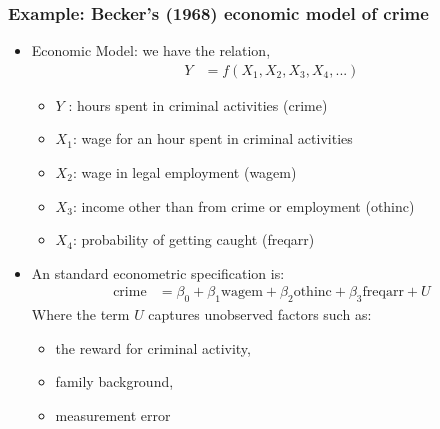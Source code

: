 \begin{frame} [allowframebreaks]\frametitle{Example: Becker's (1968) economic model of crime}
  \begin{itemize}
  \item Economic Model: we have the relation,
     \begin{align*}
      Y &= f(X_1, X_2, X_3, X_4, ...)
       \end{align*}
    \begin{itemize}
    \item $Y$ : hours spent in criminal activities (crime)
    \item $X_1$: wage for an hour spent in criminal activities
    \item $X_2$:  wage in legal employment (wagem)
    \item $X_3$: income other than from crime or employment (othinc)
    \item $X_4$: probability of getting caught (freqarr)
    \end{itemize}
  \item An standard  econometric specification is:
     \begin{align*} 
     \mathrm{crime} &= \beta_0 + \beta_1 \mathrm{wagem} + \beta_2
    \mathrm{othinc} + \beta_3 \mathrm{freqarr} + U
    \end{align*}
    Where the term $U$ captures unobserved factors such as:
    \begin{itemize}
    \item the reward for criminal activity, 
    \item  family background, 
    \item measurement error
    \end{itemize}
  \end{itemize}
\end{frame}

